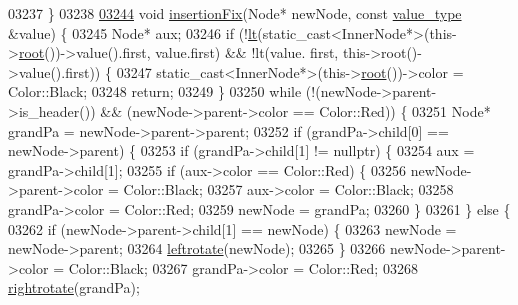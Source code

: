 \begin{DoxyCode}
03237         \}
03238 
\hypertarget{map_8h_source.tex_l03244}{}\hyperlink{classaed2_1_1map_abe3f47a745e17a6327943b813ff6bfb3_abe3f47a745e17a6327943b813ff6bfb3}{03244}         \textcolor{keywordtype}{void} \hyperlink{classaed2_1_1map_abe3f47a745e17a6327943b813ff6bfb3_abe3f47a745e17a6327943b813ff6bfb3}{insertionFix}(Node* newNode, \textcolor{keyword}{const} \hyperlink{classaed2_1_1map_a719db98e0ff9a837610f76be33264680_a719db98e0ff9a837610f76be33264680}{value\_type} &value) \{
03245             Node* aux;
03246             \textcolor{keywordflow}{if} (!\hyperlink{classaed2_1_1map_a0e5be36fae0693e4665bd2a615e7550a_a0e5be36fae0693e4665bd2a615e7550a}{lt}(static\_cast<InnerNode*>(this->\hyperlink{classaed2_1_1map_a07ab50eda249a57858a34037d4c4c7b2_a07ab50eda249a57858a34037d4c4c7b2}{root}())->value().first, value.first) && !lt(value.
      first, this->root()->value().first)) \{
03247                 \textcolor{keyword}{static\_cast<}InnerNode*\textcolor{keyword}{>}(this->\hyperlink{classaed2_1_1map_a07ab50eda249a57858a34037d4c4c7b2_a07ab50eda249a57858a34037d4c4c7b2}{root}())->color = Color::Black;
03248                 \textcolor{keywordflow}{return};
03249             \}
03250             \textcolor{keywordflow}{while} (!(newNode->parent->is\_header())  && (newNode->parent->color == Color::Red)) \{
03251                 Node* grandPa = newNode->parent->parent;
03252                 \textcolor{keywordflow}{if} (grandPa->child[0] == newNode->parent) \{
03253                     \textcolor{keywordflow}{if} (grandPa->child[1] != \textcolor{keyword}{nullptr}) \{
03254                         aux = grandPa->child[1];
03255                         \textcolor{keywordflow}{if} (aux->color == Color::Red) \{
03256                             newNode->parent->color = Color::Black;
03257                             aux->color = Color::Black;
03258                             grandPa->color = Color::Red;
03259                             newNode = grandPa;
03260                         \}
03261                     \} \textcolor{keywordflow}{else} \{
03262                         \textcolor{keywordflow}{if} (newNode->parent->child[1] == newNode) \{
03263                             newNode = newNode->parent;
03264                             \hyperlink{classaed2_1_1map_ad764851f1534f2db0964c4f729056a1e_ad764851f1534f2db0964c4f729056a1e}{leftrotate}(newNode);
03265                         \}
03266                         newNode->parent->color = Color::Black;
03267                         grandPa->color = Color::Red;
03268                         \hyperlink{classaed2_1_1map_a816d69fa4dfe18a984dc3628fee14e2f_a816d69fa4dfe18a984dc3628fee14e2f}{rightrotate}(grandPa);

\end{DoxyCode}

